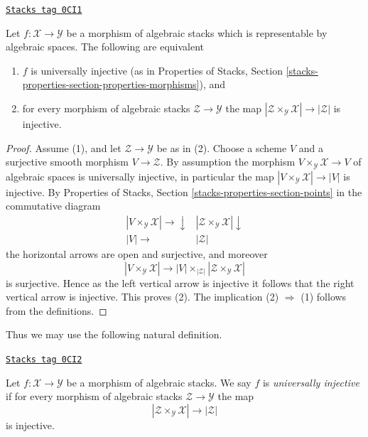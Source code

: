 \begin{lemma}
\label{stacks-morphisms-lemma-characterize-representable-universally-injective}
\href{https://stacks.math.columbia.edu/tag/0CI1}{\texttt{Stacks tag 0CI1}}

Let $f : \mathcal{X} \to \mathcal{Y}$ be a morphism of
algebraic stacks which is representable by algebraic spaces.
The following are equivalent
\begin{enumerate}
\item $f$ is universally injective (as in Properties of Stacks,
Section \ref{stacks-properties-section-properties-morphisms}), and
\item for every morphism of algebraic stacks $\mathcal{Z} \to \mathcal{Y}$
the map $|\mathcal{Z} \times_\mathcal{Y} \mathcal{X}| \to |\mathcal{Z}|$
is injective.
\end{enumerate}
\end{lemma}

\begin{proof}
Assume (1), and let $\mathcal{Z} \to \mathcal{Y}$ be as in (2).
Choose a scheme $V$ and a surjective smooth morphism $V \to \mathcal{Z}$.
By assumption the morphism $V \times_\mathcal{Y} \mathcal{X} \to V$
of algebraic spaces is universally injective, in particular the map
$|V \times_\mathcal{Y} \mathcal{X}| \to |V|$ is injective. By
Properties of Stacks, Section \ref{stacks-properties-section-points}
in the commutative diagram
$$
\begin{array}{cc}|V \times_\mathcal{Y} \mathcal{X}| \longrightarrow\downarrow & |\mathcal{Z} \times_\mathcal{Y} \mathcal{X}| \downarrow \\ |V| \longrightarrow & |\mathcal{Z}|\end{array}
$$
the horizontal arrows are open and surjective, and moreover
$$
|V \times_\mathcal{Y} \mathcal{X}| \longrightarrow
|V| \times_{|\mathcal{Z}|} |\mathcal{Z} \times_\mathcal{Y} \mathcal{X}|
$$
is surjective. Hence as the left vertical arrow is injective it follows that
the right vertical arrow is injective. This proves (2).
The implication (2) $\Rightarrow$ (1) follows from the definitions.
\end{proof}

Thus we may use the following natural definition.

\begin{definition}
\label{stacks-morphisms-definition-universally-injective}
\href{https://stacks.math.columbia.edu/tag/0CI2}{\texttt{Stacks tag 0CI2}}

Let $f : \mathcal{X} \to \mathcal{Y}$ be a morphism of algebraic stacks.
We say $f$ is {\it universally injective} if for every morphism
of algebraic stacks $\mathcal{Z} \to \mathcal{Y}$ the map
$$
|\mathcal{Z} \times_\mathcal{Y} \mathcal{X}| \to |\mathcal{Z}|
$$
is injective.
\end{definition}

